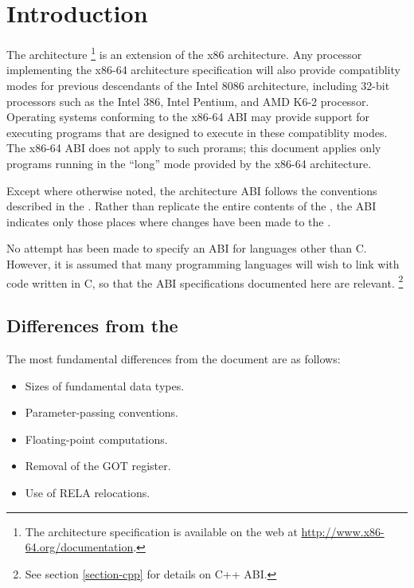\chapter{Introduction}

The \xARCH architecture \footnote{The architecture specification is
  available on the web at \url{http://www.x86-64.org/documentation}.} is an
extension of the x86 architecture.  Any processor implementing the
x86-64 architecture specification will also provide compatiblity modes
for previous descendants of the Intel 8086 architecture, including
32-bit processors such as the Intel 386, Intel Pentium, and AMD K6-2
processor.  Operating systems conforming to the x86-64 ABI may provide
support for executing programs that are designed to execute in these
compatiblity modes.  The x86-64 ABI does not apply to such prorams;
this document applies only programs running in the ``long'' mode
provided by the x86-64 architecture.

Except where otherwise noted, the \xARCH architecture ABI follows the
conventions described in the \intelabi.  Rather than replicate the
entire contents of the \intelabi, the \xARCH ABI indicates only those
places where changes have been made to the \intelabi.

No attempt has been made to specify an ABI for languages other than C.
However, it is assumed that many programming languages will wish to
link with code written in C, so
that the ABI specifications documented here are relevant.%
\footnote{See section \ref{section-cpp} for details on C++ ABI.}

\section{Differences from the \intelabi}

The most fundamental differences from the \intelabi document
are as follows:
\begin{itemize}
\item Sizes of fundamental data types.
\item Parameter-passing conventions.
\item Floating-point computations.
\item Removal of the GOT register.
\item Use of RELA relocations.
\end{itemize}

